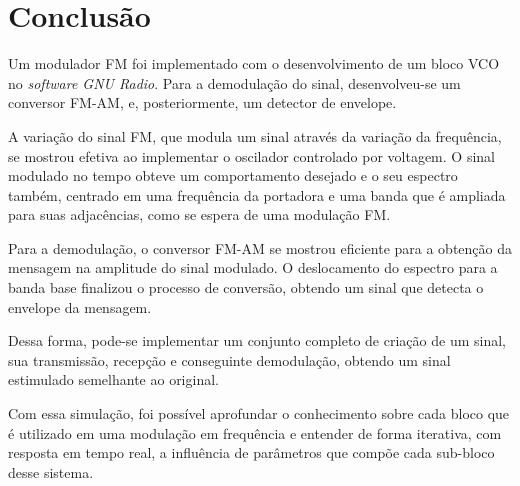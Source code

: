 \newpage
\section{Conclusão}
Um modulador FM foi implementado com o desenvolvimento de um bloco VCO no \textit{software GNU Radio}. Para a demodulação do sinal, desenvolveu-se um conversor FM-AM, e, posteriormente, um detector de envelope.

A variação do sinal FM, que modula um sinal através da variação da frequência, se mostrou efetiva ao implementar o oscilador controlado por voltagem. O sinal modulado no tempo obteve um comportamento desejado e o seu espectro também, centrado em uma frequência da portadora e uma banda que é ampliada para suas adjacências, como se espera de uma modulação FM.

Para a demodulação, o conversor FM-AM se mostrou eficiente para a obtenção da mensagem na amplitude do sinal modulado. O deslocamento do espectro para a banda base finalizou o processo de conversão, obtendo um sinal que detecta o envelope da mensagem. 

Dessa forma, pode-se implementar um conjunto completo de criação de um sinal, sua transmissão, recepção e conseguinte demodulação, obtendo um sinal estimulado semelhante ao original.

Com essa simulação, foi possível aprofundar o conhecimento sobre cada bloco que é utilizado em uma modulação em frequência e entender de forma iterativa, com resposta em tempo real, a influência de parâmetros que compõe cada sub-bloco desse sistema. 

